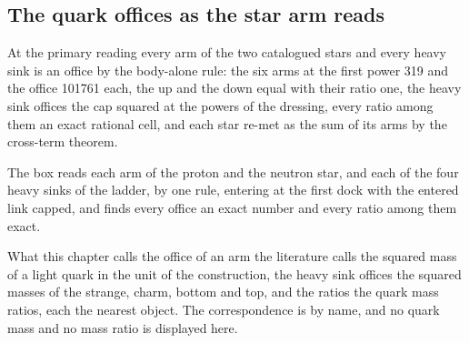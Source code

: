 \subsection{The quark offices as the star arm reads}\label{mod:VII-7-D538212-qarm-t1}
\begin{chtheorem}\label{box:VII-7-D538212-qarm-t1:1}
At the primary reading every arm of the two catalogued stars and every heavy sink is an office by the body-alone rule: the six arms at the first power 319 and the office 101761 each, the up and the down equal with their ratio one, the heavy sink offices the cap squared at the powers of the dressing, every ratio among them an exact rational cell, and each star re-met as the sum of its arms by the cross-term theorem.
\end{chtheorem}
The box reads each arm of the proton and the neutron star, and each of the four heavy sinks of the ladder, by one rule, entering at the first dock with the entered link capped, and finds every office an exact number and every ratio among them exact.
\begin{chbridge}
What this chapter calls the office of an arm the literature calls the squared mass of a light quark in the unit of the construction, the heavy sink offices the squared masses of the strange, charm, bottom and top, and the ratios the quark mass ratios, each the nearest object. The correspondence is by name, and no quark mass and no mass ratio is displayed here.
\end{chbridge}

